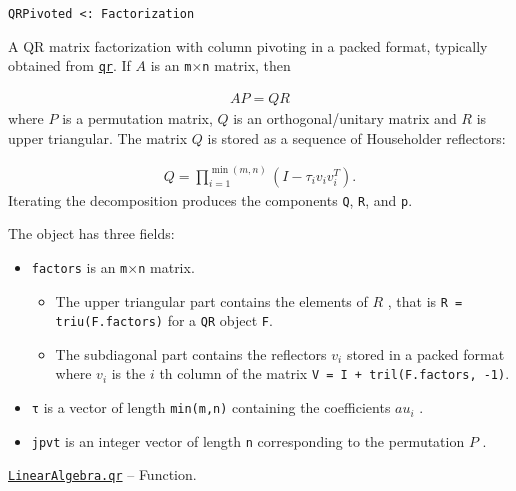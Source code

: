 \begin{adjustwidth}{2em}{0pt}


\begin{verbatim}
QRPivoted <: Factorization
\end{verbatim}

A QR matrix factorization with column pivoting in a packed format, typically obtained from \hyperlink{4122539696772350360}{\texttt{qr}}. If  \(A\)  is an \texttt{m}×\texttt{n} matrix, then

\begin{equation*}
\begin{split}A P = Q R\end{split}\end{equation*}
where  \(P\)  is a permutation matrix,  \(Q\)  is an orthogonal/unitary matrix and  \(R\)  is upper triangular. The matrix  \(Q\)  is stored as a sequence of Householder reflectors:

\begin{equation*}
\begin{split}Q = \prod_{i=1}^{\min(m,n)} (I - \tau_i v_i v_i^T).\end{split}\end{equation*}
Iterating the decomposition produces the components \texttt{Q}, \texttt{R}, and \texttt{p}.

The object has three fields:

\begin{itemize}
\item \texttt{factors} is an \texttt{m}×\texttt{n} matrix.

\begin{itemize}
\item The upper triangular part contains the elements of  \(R\) , that is \texttt{R = triu(F.factors)} for a \texttt{QR} object \texttt{F}.


\item The subdiagonal part contains the reflectors  \(v_i\)  stored in a packed format where  \(v_i\)  is the  \(i\) th column of the matrix \texttt{V = I + tril(F.factors, -1)}.

\end{itemize}

\item \texttt{τ} is a vector of length \texttt{min(m,n)} containing the coefficients  \(au_i\) .


\item \texttt{jpvt} is an integer vector of length \texttt{n} corresponding to the permutation  \(P\) .

\end{itemize}


\end{adjustwidth}
\hypertarget{4122539696772350360}{}
\hyperlink{4122539696772350360}{\texttt{LinearAlgebra.qr}}  -- {Function.}

